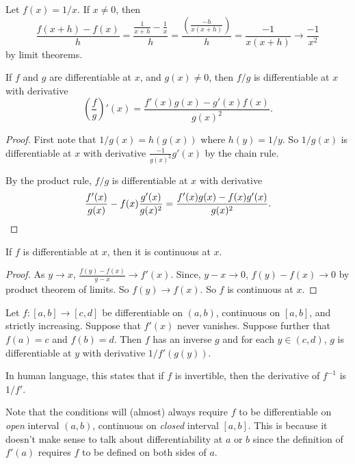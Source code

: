 \documentclass[a4paper]{article}
\begin{document}
\begin{eg}
  Let $f(x) = 1/x$. If $x\not = 0$, then
  \[
    \frac{f(x + h) - f(x)}{h} = \frac{\frac{1}{x + h} - \frac{1}{x}}{h} = \frac{\left(\frac{-h}{x(x + h)}\right)}{h} = \frac{-1}{x(x + h)} \to \frac{-1}{x^2}
  \]
  by limit theorems.
\end{eg}

\begin{lemma}
  If $f$ and $g$ are differentiable at $x$, and $g(x) \not = 0$, then $f/g$ is differentiable at $x$ with derivative
  \[
    \left(\frac{f}{g}\right)'(x) = \frac{f'(x)g(x) - g'(x)f(x)}{g(x)^2}.
  \]
\end{lemma}

\begin{proof}
  First note that $1/g(x) = h(g(x))$ where $h(y) = 1/y$. So $1/g(x)$ is differentiable at $x$ with derivative $\displaystyle \frac{-1}{g(x)^2}g'(x)$ by the chain rule.

  By the product rule, $f/g$ is differentiable at $x$ with derivative
  \[
    \frac{f'(x)}{g(x)} - f(x)\frac{g'(x)}{g(x)^2} = \frac{f'(x)g(x) - f(x)g'(x)}{g(x)^2}.\qedhere
  \]
\end{proof}
\begin{lemma}
  If $f$ is differentiable at $x$, then it is continuous at $x$.
\end{lemma}

\begin{proof}
  As $y\to x$, $\displaystyle \frac{f(y) - f(x)}{y - x} \to f'(x)$. Since, $y - x \to 0$, $f(y) - f(x) \to 0$ by product theorem of limits. So $f(y) \to f(x)$. So $f$ is continuous at $x$.
\end{proof}

\begin{thm}
  Let $f:[a, b]\to [c, d]$ be differentiable on $(a, b)$, continuous on $[a, b]$, and strictly increasing. Suppose that $f'(x)$ never vanishes. Suppose further that $f(a) = c$ and $f(b) = d$. Then $f$ has an inverse $g$ and for each $y\in (c, d)$, $g$ is differentiable at $y$ with derivative $1/f'(g(y))$.

  In human language, this states that if $f$ is invertible, then the derivative of $f^{-1}$ is $1/f'$.
\end{thm}
Note that the conditions will (almost) always require $f$ to be differentiable on \emph{open} interval $(a, b)$, continuous on \emph{closed} interval $[a, b]$. This is because it doesn't make sense to talk about differentiability at $a$ or $b$ since the definition of $f'(a)$ requires $f$ to be defined on both sides of $a$.
\end{document}
